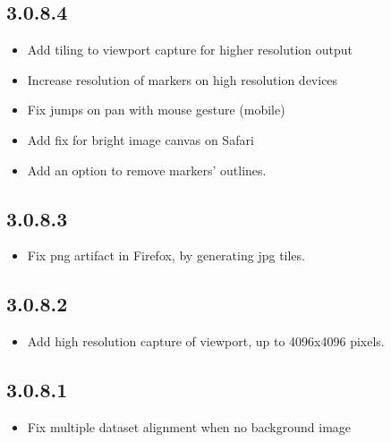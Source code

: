 \documentclass[letterpaper,10pt,english,openany,oneside]{sphinxmanual}
\begin{document}
\subsection{3.0.8.4}
\label{\detokenize{docs/intro/versions:id37}}\begin{itemize}
\item {} 
\sphinxAtStartPar
Add tiling to viewport capture for higher resolution output

\item {} 
\sphinxAtStartPar
Increase resolution of markers on high resolution devices

\item {} 
\sphinxAtStartPar
Fix jumps on pan with mouse gesture (mobile)

\item {} 
\sphinxAtStartPar
Add fix for bright image canvas on Safari

\item {} 
\sphinxAtStartPar
Add an option to remove markers’ outlines.

\end{itemize}


\subsection{3.0.8.3}
\label{\detokenize{docs/intro/versions:id38}}\begin{itemize}
\item {} 
\sphinxAtStartPar
Fix png artifact in Firefox, by generating jpg tiles.

\end{itemize}


\subsection{3.0.8.2}
\label{\detokenize{docs/intro/versions:id39}}\begin{itemize}
\item {} 
\sphinxAtStartPar
Add high resolution capture of viewport, up to 4096x4096 pixels.

\end{itemize}


\subsection{3.0.8.1}
\label{\detokenize{docs/intro/versions:id40}}\begin{itemize}
\item {} 
\sphinxAtStartPar
Fix multiple dataset alignment when no background image

\end{itemize}
\end{document}
